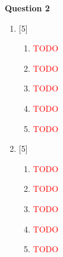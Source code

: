 \par
\noindent
\textbf{Question 2}\\
\begin{enumerate}[label=(\roman*)]

    \item \hfill [5]
        \begin{enumerate}[label=(\alph*)]
            \item \textcolor{red}{TODO} 
            \item \textcolor{red}{TODO} 
            \item \textcolor{red}{TODO} 
            \item \textcolor{red}{TODO} 
            \item \textcolor{red}{TODO} 
        \end{enumerate}

    \item \hfill [5]
        \begin{enumerate}[label=(\alph*)]
            \item \textcolor{red}{TODO} 
            \item \textcolor{red}{TODO} 
            \item \textcolor{red}{TODO} 
            \item \textcolor{red}{TODO} 
            \item \textcolor{red}{TODO} 
        \end{enumerate}


\end{enumerate}
